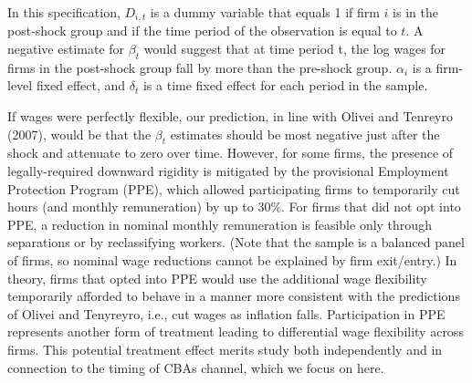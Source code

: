 \documentclass[12pt]{article}
\begin{document}
	In this specification, $D_{i,t}$ is a dummy variable that equals 1 if firm $i$ is in the post-shock group and if the time period of the observation is equal to $t$. A negative estimate for $\beta_t$ would suggest that at time period t, the log wages for firms in the post-shock group fall by more than the pre-shock group. $\alpha_i$ is a firm-level fixed effect, and $\delta_t$ is a time fixed effect for each period in the sample. 

	If wages were perfectly flexible, our prediction, in line with Olivei and Tenreyro (2007), would be that the $\beta_t$ estimates should be most negative just after the shock and attenuate to zero over time. However, for some firms, the presence of legally-required downward rigidity is mitigated by the provisional Employment Protection Program (PPE), which allowed participating firms to temporarily cut hours (and monthly remuneration) by up to 30\%. For firms that did not opt into PPE, a reduction in nominal monthly remuneration is feasible only through separations or by reclassifying workers. (Note that the sample is a balanced panel of firms, so nominal wage reductions cannot be explained by firm exit/entry.) In theory, firms that opted into PPE would use the additional wage flexibility temporarily afforded to behave in a manner more consistent with the predictions of Olivei and Tenyreyro, i.e., cut wages as inflation falls. Participation in PPE represents another form of treatment leading to differential wage flexibility across firms. This potential treatment effect merits study both independently and in connection to the timing of CBAs channel, which we focus on here. 
\end{document}
